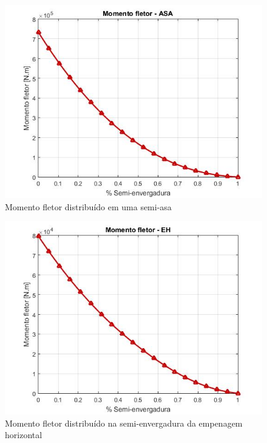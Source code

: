 \begin{figure}
\centering
\includegraphics[width=\textwidth]{cargas/imagens/flet_ASA.jpg}
\caption{Momento fletor distribuído em uma semi-asa}
\label{fig:flet_ASA}
\end{figure}

\begin{figure}
\centering
\includegraphics[width=\textwidth]{cargas/imagens/flet_EH.jpg}
\caption{Momento fletor distribuído na semi-envergadura da empenagem horizontal}
\label{fig:flet_EH}
\end{figure}

